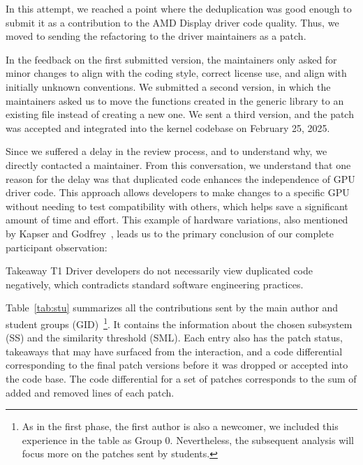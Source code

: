 \documentclass[sigconf]{acmart}
\newenvironment{highlight-box}[1]{%
  \begin{framed}%
  \noindent\textbf{#1:} \itshape\ignorespaces}{%
  \end{framed}}
\begin{document}
In this attempt, we reached a point where the deduplication was good enough to submit it as a contribution to the AMD Display driver code quality. Thus, we moved to sending the refactoring to the driver maintainers as a patch.

In the feedback on the first submitted version, the maintainers only asked for minor changes to align with the coding style, correct license use, and align with initially unknown conventions. We submitted a second version, in which the maintainers asked us to move the functions created in the generic library to an existing file instead of creating a new one. We sent a third version, and the patch was accepted and integrated into the kernel codebase on February 25, 2025.

Since we suffered a delay in the review process, and to understand why, we directly contacted a maintainer. From this conversation, we understand that one reason for the delay was that duplicated code enhances the independence of GPU driver code. This approach allows developers to make changes to a specific GPU without needing to test compatibility with others, which helps save a significant amount of time and effort. This example of hardware variations, also mentioned by Kapser and Godfrey~\cite{cloneharm}, leads us to the primary conclusion of our complete participant observation:

\begin{highlight-box}{Takeaway T1}
  Driver developers do not necessarily view
  duplicated code negatively, which contradicts standard software engineering
  practices.
\end{highlight-box}

Table~\ref{tab:stu} summarizes all the contributions sent by the main author and student groups (GID)~\footnote{As in the first phase, the first author is also a newcomer, we included this experience in the table as Group 0. Nevertheless, the subsequent analysis will focus more on the patches sent by students.}. It contains the information about the chosen subsystem (SS) and the similarity threshold (SML). Each entry also has the patch status, takeaways that may have surfaced from the interaction, and a code differential corresponding to the final patch versions before it was dropped or accepted into the code base. The code differential for a set of patches corresponds to the sum of added and removed lines of each patch.
\end{document}
